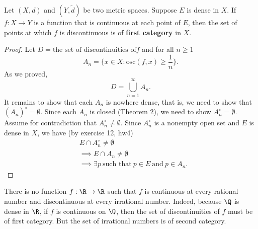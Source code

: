 \begin{theorem}[ ]
    Let \( (X,d) \) and \( (Y,\tilde{d}) \) be two metric spaces. Suppose \( E  \) is dense in \( X  \). If \( f: X \to Y  \) is a function that is continuous at each point of \( E  \), then the set of points at which \( f  \) is discontinuous is of \textbf{first category} in \( X  \).
\end{theorem}
\begin{proof}
    Let \( D = \text{the set of discontinuities of} f  \) and for all \( n \geq 1  \) 
    \[  {A}_{n} = \{  x \in X : \text{osc}(f,x) \geq \frac{1  }{ n } \}. \]
    As we proved, 
    \[  D = \bigcup_{ n=1  }^{ \infty  }  {A}_{n}. \]
    It remains to show that each \( {A}_{n} \) is nowhere dense, that is, we need to show that \( (\overline{{A}_{n}})^{\circ} = \emptyset \). Since each \( {A}_{n} \) is closed (Theorem 2), we need to show \( {A}_{n}^{\circ} = \emptyset \). Assume for contradiction that \( {A}_{n}^{\circ} \neq \emptyset \). Since \( {A}_{n}^{\circ}  \) is a nonempty open set and \( E  \) is dense in \( X  \), we have (by exercise 12, hw4) 
    \begin{align*}
         &E \cap {A}_{n}^{\circ} \neq \emptyset \\
         &\implies E \cap {A}_{n} \neq \emptyset \\
         &\implies \exists  p \  \text{such that} \ p \in E \ \text{and} \ p \in {A}_{n}.
    \end{align*}

\end{proof}

\begin{remark}
    There is no function \( f: \R \to \R  \) such that \( f  \) is continuous at every rational number and discontinuous at every irrational number. Indeed, because \( \Q  \) is dense in \( \R  \), if \( f  \) is continuous on \( \Q  \), then the set of discontinuities of \( f  \) must be of first category. But the set of irrational numbers is of second category. 
\end{remark}
